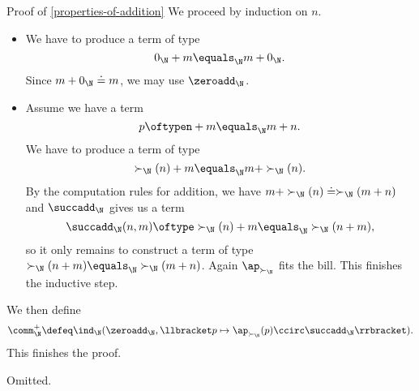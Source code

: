 \begin{Proof}{Proof of \cref{properties-of-addition}}
    We proceed by induction on $n$.
    \begin{itemize}
        \item{}We have to produce a term of type
            \[
                0_{\N}+m%
                \equals_{\N}%
                m+0_{\N}.%
            \]%
            Since $m+0_{\N}\doteq m$, we may use $\zeroadd_{\N}$.
        \item{}Assume we have a term
            \[
                p%
                \oftype%
                n+m%
                \equals_{\N}%
                m+n.%
            \]%
            We have to produce a term of type
            \[
                \succ_{\N}(n)+m%
                \equals_{\N}%
                m+\succ_{\N}(n).%
            \]%
            By the computation rules for addition, we have $m+\succ_{\N}(n)\doteq\succ_{\N}(m+n)$ and $\succadd_{\N}$ gives us a term
            \[
                \succadd_{\N}(n,m)%
                \oftype%
                \succ_{\N}(n)+m%
                \equals_{\N}%
                \succ_{\N}(n+m),%
            \]%
            so it only remains to construct a term of type $\succ_{\N}(n+m)\equals_{\N}\succ_{\N}(m+n)$. Again $\ap_{\succ_{\N}}$ fits the bill. This finishes the inductive step.
    \end{itemize}
    We then define
    \[
        \comm^{+}_{\N}%
        \defeq%
        \ind_{\N}(\zeroadd_{\N},\llbracket p\mapsto\ap_{\succ_{\N}}(p)\ccirc\succadd_{\N}\rrbracket).%
    \]%
    This finishes the proof.

    Omitted.
\end{Proof}
